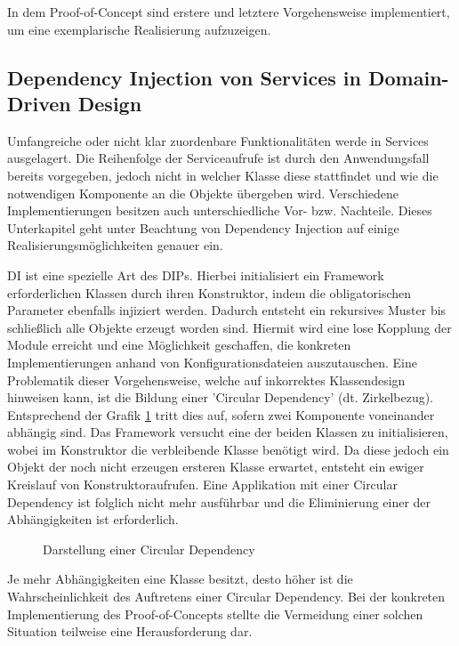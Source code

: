 In dem Proof-of-Concept sind erstere und letztere Vorgehensweise implementiert, um eine exemplarische Realisierung aufzuzeigen. 

\subsection{Dependency Injection von Services in Domain-Driven Design}

Umfangreiche oder nicht klar zuordenbare Funktionalitäten werde in Services ausgelagert. Die Reihenfolge der Serviceaufrufe ist durch den Anwendungsfall bereits vorgegeben, jedoch nicht in welcher Klasse diese stattfindet und wie die notwendigen Komponente an die Objekte übergeben wird. Verschiedene Implementierungen besitzen auch unterschiedliche Vor- bzw. Nachteile. Dieses Unterkapitel geht unter Beachtung von Dependency Injection auf einige Realisierungsmöglichkeiten genauer ein. 

\Gls{DI} ist eine spezielle Art des \acrlong{DIP}s. Hierbei initialisiert ein Framework erforderlichen Klassen durch ihren Konstruktor, indem die obligatorischen Parameter ebenfalls injiziert werden. Dadurch entsteht ein rekursives Muster bis schließlich alle Objekte erzeugt worden sind. Hiermit wird eine lose Kopplung der Module erreicht und eine Möglichkeit geschaffen, die konkreten Implementierungen anhand von Konfigurationsdateien auszutauschen. Eine Problematik dieser Vorgehensweise, welche auf inkorrektes Klassendesign hinweisen kann, ist die Bildung einer 'Circular Dependency' (dt. Zirkelbezug). Entsprechend der Grafik \ref{fig:circulardependency} tritt dies auf, sofern zwei Komponente voneinander abhängig sind. Das Framework versucht eine der beiden Klassen zu initialisieren, wobei im Konstruktor die verbleibende Klasse benötigt wird. Da diese jedoch ein Objekt der noch nicht erzeugen ersteren Klasse erwartet, entsteht ein ewiger Kreislauf von Konstruktoraufrufen. Eine Applikation mit einer Circular Dependency ist folglich nicht mehr ausführbar und die Eliminierung einer der Abhängigkeiten ist erforderlich. 

\begin{figure}[htbp]
	\centering
	\footnotesize
	
	\caption{Darstellung einer Circular Dependency}
	\label{fig:circulardependency}
\end{figure}

Je mehr Abhängigkeiten eine Klasse besitzt, desto höher ist die Wahrscheinlichkeit des Auftretens einer Circular Dependency. Bei der konkreten Implementierung des Proof-of-Concepts stellte die Vermeidung einer solchen Situation teilweise eine Herausforderung dar.


